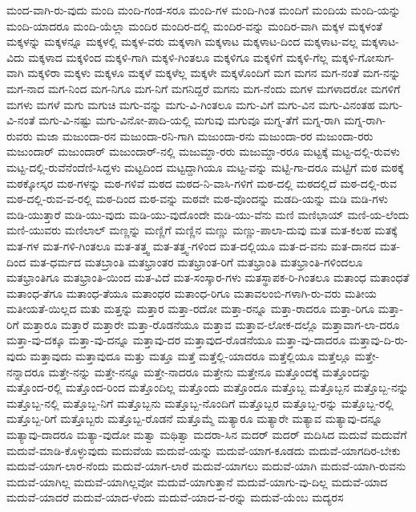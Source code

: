 {ಮಂದ-ವಾಗಿ-ರು-ವುದು
ಮಂದಿ
ಮಂದಿ-ಗಂಡ-ಸರೂ
ಮಂದಿ-ಗಳ
ಮಂದಿ-ಗಿಂತ
ಮಂದಿಗೆ
ಮಂದಿಯ
ಮಂದಿ-ಯನ್ನು
ಮಂದಿ-ಯಾದರೂ
ಮಂದಿ-ಯೆಲ್ಲಾ
ಮಂದಿರ
ಮಂದಿರ-ದಲ್ಲಿ
ಮಂದಿರ-ವನ್ನು
ಮಂದಿರ-ವಾಗಿ
ಮಕ್ಕಳ
ಮಕ್ಕಳಂತೆ
ಮಕ್ಕಳನ್ನು
ಮಕ್ಕಳನ್ನೂ
ಮಕ್ಕಳಲ್ಲಿ
ಮಕ್ಕಳ-ವರು
ಮಕ್ಕಳಾಗಿ
ಮಕ್ಕಳಾಟ
ಮಕ್ಕಳಾಟ-ದಿಂದ
ಮಕ್ಕಳಾಟ-ವಲ್ಲ
ಮಕ್ಕಳಾಟ-ವಿದು
ಮಕ್ಕಳಾದ
ಮಕ್ಕಳಿಂದ
ಮಕ್ಕಳಿ-ಗಾಗಿ
ಮಕ್ಕಳಿ-ಗಿಂತಲೂ
ಮಕ್ಕಳಿಗೂ
ಮಕ್ಕಳಿಗೆ
ಮಕ್ಕಳಿ-ಗೆಲ್ಲ
ಮಕ್ಕಳಿ-ಗೋಸುಗ-ವಾಗಿ
ಮಕ್ಕಳಿರಾ
ಮಕ್ಕಳು
ಮಕ್ಕಳೂ
ಮಕ್ಕಳೆ
ಮಕ್ಕಳೆಲ್ಲ
ಮಕ್ಕಳೇ
ಮಕ್ಕಳೊಂದಿಗೆ
ಮಗ
ಮಗನ
ಮಗ-ನಂತೆ
ಮಗ-ನನ್ನು
ಮಗ-ನಾದ
ಮಗ-ನಿಂದ
ಮಗ-ನಿಗೂ
ಮಗ-ನಿಗೆ
ಮಗನಿದ್ದರೆ
ಮಗನು
ಮಗ-ನೆಂದು
ಮಗಳ
ಮಗಳಾದರೋ
ಮಗಳಿಗೆ
ಮಗಳು
ಮಗಳೆ
ಮಗು
ಮಗುಚಿ
ಮಗು-ವನ್ನು
ಮಗು-ವಿ-ಗಿಂತಲೂ
ಮಗು-ವಿಗೆ
ಮಗು-ವಿನ
ಮಗು-ವಿನಂತಹ
ಮಗು-ವಿ-ನಂತೆ
ಮಗು-ವಿ-ನಷ್ಟು
ಮಗು-ವಿನೋ-ಪಾದಿ-ಯಲ್ಲಿ
ಮಗುವು
ಮಗುವೂ
ಮಗ್ನ-ತೆಗೆ
ಮಗ್ನ-ರಾಗಿ
ಮಗ್ನ-ರಾಗಿ-ರುವರು
ಮಜಾ
ಮಜುಂದಾ-ರನ
ಮಜುಂದಾ-ರನಿ-ಗಾಗಿ
ಮಜುಂದಾ-ರನು
ಮಜುಂದಾ-ರರ
ಮಜುಂದಾ-ರರು
ಮಜುಂದಾರ್
ಮಜುಂದಾರ್‌
ಮಜುಂದಾರ್‌-ನಲ್ಲಿ
ಮಜುಮ್ದಾ-ರರು
ಮಜುಮ್ದಾ-ರರೂ
ಮಟ್ಟಕ್ಕೆ
ಮಟ್ಟ-ದಲ್ಲಿ-ರುವಳು
ಮಟ್ಟ-ದಲ್ಲಿ-ರುವೆನೆಂದೆಣಿ-ಸಿದ್ದಳು
ಮಟ್ಟದಿಂದ
ಮಟ್ಟದ್ದಾಗಿಯೂ
ಮಟ್ಟ-ವನ್ನು
ಮಟ್ಟಿ-ಗಾ-ದರೂ
ಮಟ್ಟಿಗೆ
ಮಠ
ಮಠಕ್ಕೆ
ಮಠಕ್ಕೋಸ್ಕರ
ಮಠ-ಗಳನ್ನು
ಮಠ-ಗಳಿವೆ
ಮಠದ
ಮಠದ-ನಿ-ವಾಸಿ-ಗಳಿಗೆ
ಮಠ-ದಲ್ಲಿ
ಮಠದಲ್ಲಿದೆ
ಮಠ-ದಲ್ಲಿ-ರುವ
ಮಠ-ದಲ್ಲಿ-ರುವ-ವ-ರಲ್ಲಿ
ಮಠ-ದಿಂದ
ಮಠ-ವನ್ನು
ಮಠವೇ
ಮಠ-ವೊಂದನ್ನು
ಮಡದಿ-ಯನ್ನು
ಮಡಿ
ಮಡಿ-ಗಳು
ಮಡಿ-ಯುತ್ತಾರೆ
ಮಡಿ-ಯು-ವುದು
ಮಡಿ-ಯು-ವುದೊಂದೇ
ಮಡಿ-ಯು-ವೆನು
ಮಣಿ
ಮಣಿಭಾಯ್
ಮಣಿ-ಯ-ಲೆಂದು
ಮಣಿ-ಯುವರು
ಮಣಿಲಾಲ್
ಮಣ್ಣನ್ನು
ಮಣ್ಣಿಗೆ
ಮಣ್ಣಿನ
ಮಣ್ಣು
ಮಣ್ಣು-ಪಾಲಾ-ದುವು
ಮತ
ಮತ-ಕಲಹ
ಮತಕ್ಕೆ
ಮತ-ಗಳ
ಮತ-ಗಳಿ-ಗಿಂತಲೂ
ಮತ-ತತ್ತ್ವ
ಮತ-ತತ್ತ್ವ-ಗಳಿಂದ
ಮತ-ದಲ್ಲಿಯೂ
ಮತ-ದ-ವನು
ಮತ-ದಾನದ
ಮತ-ದಿಂದ
ಮತ-ಧರ್ಮದ
ಮತಬ್ರಾಂತಿ
ಮತಭ್ರಾಂತರ
ಮತಭ್ರಾಂತ-ರಿಗೆ
ಮತಭ್ರಾಂತಿ
ಮತಭ್ರಾಂತಿ-ಗಳಿಂದಲೂ
ಮತಭ್ರಾಂತಿಗೂ
ಮತಭ್ರಾಂತಿ-ಯಿಂದ
ಮತ-ವಿದೆ
ಮತ-ಸಂಸ್ಕಾರ-ಗಳು
ಮತಸ್ಥಾಪಕ-ರಿ-ಗಿಂತಲೂ
ಮತಾಂಧ
ಮತಾಂಧತೆ
ಮತಾಂಧ-ತೆಗೂ
ಮತಾಂಧ-ತೆಯೂ
ಮತಾಂಧರ
ಮತಾಂಧ-ರಿಗೂ
ಮತಾವಲಂಬಿ-ಗಳಾಗಿ-ರು-ವರು
ಮತೀಯ
ಮತೀಯತೆ-ಯಿಲ್ಲದ
ಮತು
ಮತ್ತನ್ನು
ಮತ್ತಾರ
ಮತ್ತಾ-ರದೋ
ಮತ್ತಾ-ರನ್ನೂ
ಮತ್ತಾ-ರಾದರೂ
ಮತ್ತಾ-ರಿಗೂ
ಮತ್ತಾ-ರಿಗೆ
ಮತ್ತಾರೂ
ಮತ್ತಾರೆ
ಮತ್ತಾರೇ
ಮತ್ತಾ-ರೊಡನೆಯೂ
ಮತ್ತಾವ
ಮತ್ತಾವ-ಲೋಕ-ದಲ್ಲೊ
ಮತ್ತಾವಾಗ-ಲಾ-ದರೂ
ಮತ್ತಾ-ವು-ದಕ್ಕೂ
ಮತ್ತಾ-ವು-ದನ್ನೂ
ಮತ್ತಾವು-ದರ
ಮತ್ತಾವುದ-ರೊಡನೆಯೂ
ಮತ್ತಾ-ವು-ದಾದರೂ
ಮತ್ತಾವು-ದಿ-ರು-ವುದು
ಮತ್ತಾವುದು
ಮತ್ತಾವುದೂ
ಮತ್ತು
ಮತ್ತೂ
ಮತ್ತೆ
ಮತ್ತೆಲ್ಲಿ-ಯಾದರೂ
ಮತ್ತೆಲ್ಲಿಯೂ
ಮತ್ತೆಲ್ಲೂ
ಮತ್ತೇ-ನನ್ನಾದರೂ
ಮತ್ತೇ-ನನ್ನು
ಮತ್ತೇ-ನನ್ನೂ
ಮತ್ತೇ-ನಾದರೂ
ಮತ್ತೇನು
ಮತ್ತೇನೂ
ಮತ್ತೊಂದಕ್ಕೆ
ಮತ್ತೊಂದನ್ನು
ಮತ್ತೊಂದ-ರಲ್ಲಿ
ಮತ್ತೊಂದ-ರಿಂದ
ಮತ್ತೊಂದಿಲ್ಲ
ಮತ್ತೊಂದು
ಮತ್ತೊಂದೂ
ಮತ್ತೊಬ್ಬ
ಮತ್ತೊಬ್ಬನ
ಮತ್ತೊಬ್ಬ-ನನ್ನು
ಮತ್ತೊಬ್ಬ-ನಲ್ಲಿ
ಮತ್ತೊಬ್ಬ-ನಿಗೆ
ಮತ್ತೊಬ್ಬನು
ಮತ್ತೊಬ್ಬ-ನೊಂದಿಗೆ
ಮತ್ತೊಬ್ಬರ
ಮತ್ತೊಬ್ಬ-ರನ್ನು
ಮತ್ತೊಬ್ಬ-ರಲ್ಲಿ
ಮತ್ತೊಬ್ಬ-ರಿಗೆ
ಮತ್ತೊಬ್ಬರು
ಮತ್ತೊಬ್ಬ-ರೊಡನೆ
ಮತ್ತೊಮ್ಮೆ
ಮತ್ಯಾರೂ
ಮತ್ಯಾರೇ
ಮತ್ಯಾವ
ಮತ್ಯಾವು-ದನ್ನೂ
ಮತ್ಯಾವು-ದಾದರೂ
ಮತ್ಯಾ-ವುದೋ
ಮತ್ವಾ
ಮಥಿತ್ವಾ
ಮದರಾ-ಸಿನ
ಮದರ್
ಮದರ್‌
ಮದಿಸಿದ
ಮದುವೆ
ಮದುವೆಗೆ
ಮದುವೆ-ಮಾಡಿ-ಕೊಳ್ಳುವುದು
ಮದುವೆಯ
ಮದುವೆ-ಯನ್ನು
ಮದುವೆ-ಯಾಗ-ಕೂಡದು
ಮದುವೆ-ಯಾಗದಿರ-ಬೇಕು
ಮದುವೆ-ಯಾಗ-ಲಾರ-ನೆಂದು
ಮದುವೆ-ಯಾಗ-ಲಾರೆ
ಮದುವೆ-ಯಾಗಲು
ಮದುವೆ-ಯಾಗಿ
ಮದುವೆ-ಯಾಗಿ-ರುವನು
ಮದುವೆ-ಯಾಗಿಲ್ಲ
ಮದುವೆ-ಯಾಗಿಲ್ಲವೋ
ಮದುವೆ-ಯಾಗುತ್ತಾನೆ
ಮದುವೆ-ಯಾಗು-ವು-ದಿಲ್ಲ
ಮದುವೆ-ಯಾದ
ಮದುವೆ-ಯಾದರೆ
ಮದುವೆ-ಯಾದ-ಳೆಂದು
ಮದುವೆ-ಯಾದ-ವ-ರನ್ನು
ಮದುವೆ-ಯೆಂಬ
ಮದ್ಯರಸ
}
